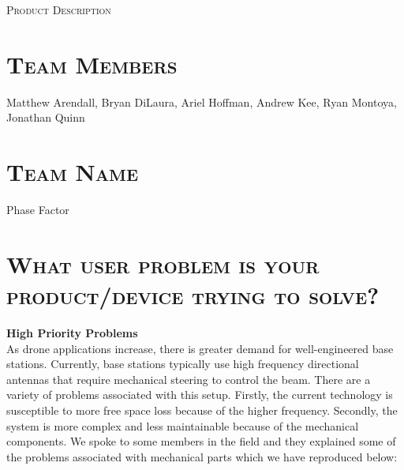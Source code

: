 \documentclass[11pt]{article}
\numberwithin{figure}{section}
\begin{document}
\begin{center}
	\textsc{\Large Product Description}\\
	\hrulefill 
\end{center}

\section{\textsc{Team Members}}
	Matthew Arendall, Bryan DiLaura, Ariel Hoffman, Andrew Kee, Ryan Montoya, Jonathan Quinn
	
\section{\textsc{Team Name}}
	Phase Factor
	
\section{\textsc{What user problem is your product/device trying to solve?}}
	\textbf{High Priority Problems}  \\ 
	As drone applications increase, there is greater demand for well-engineered base stations. Currently, base stations typically use high frequency directional antennas that require mechanical steering to control the beam. There are a variety of problems associated with this setup. Firstly, the current technology is susceptible to more free space loss because of the higher frequency. Secondly, the system is more complex and less maintainable because of the mechanical components. We spoke to some members in the field and they explained some of the problems associated with mechanical parts which we have reproduced below:
\end{document}
